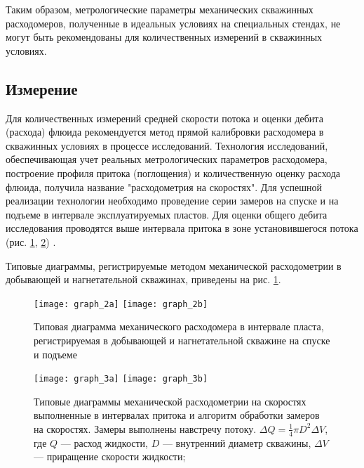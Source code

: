 Таким образом, метрологические параметры механических
скважинных расходомеров, полученные в идеальных условиях на
специальных стендах, не могут быть рекомендованы для
количественных измерений в скважинных условиях.

\subsection{Измерение}

Для количественных измерений средней скорости потока и оценки
дебита (расхода) флюида рекомендуется метод прямой калибровки
расходомера в скважинных условиях в процессе исследований.
Технология исследований, обеспечивающая учет реальных
метрологических параметров расходомера, построение профиля
притока (поглощения) и количественную оценку расхода флюида,
получила название "расходометрия на скоростях". Для успешной
реализации технологии необходимо проведение серии замеров на
спуске и на подъеме в интервале эксплуатируемых пластов. Для оценки
общего дебита исследования проводятся выше интервала притока в
зоне установившегося потока (рис. \ref{fig:graph_2}, \ref{fig:graph_3}) \cite{thermodyn}.

Типовые диаграммы, регистрируемые методом механической
расходометрии в добывающей и нагнетательной скважинах, приведены
на рис. \ref{fig:graph_2}.

\begin{figure}[h]
\centering
\texttt{[image: graph\_2a]}
\texttt{[image: graph\_2b]}
\caption{
Типовая диаграмма механического
расходомера в интервале
пласта, регистрируемая в
добывающей и нагнетательной скважине
на спуске и подъеме
}
\label{fig:graph_2}
\end{figure}

\begin{figure}[!h]
\centering
\texttt{[image: graph\_3a]}
\texttt{[image: graph\_3b]}
\caption{
Типовые диаграммы механической расходометрии на
скоростях выполненные в интервалах притока и алгоритм обработки
замеров на скоростях. Замеры выполнены навстречу потоку. $\Delta Q = \frac 1 4 \pi D^2 \Delta V$,
где $Q$ --- расход жидкости, $D$ --- внутренний диаметр скважины,
$\Delta V$ --- приращение скорости жидкости;
}
\label{fig:graph_3}
\end{figure}

\clearpage
